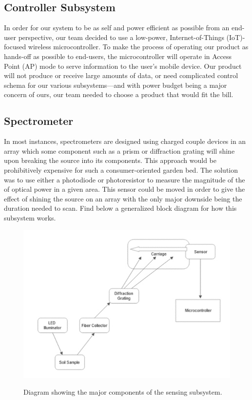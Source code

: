 \documentclass[journal]{IEEEtran}
\begin{document}
\subsection{Controller Subsystem}

In order for our system to be as self and power efficient as possible from an end-user perspective, our team decided to use a low-power, Internet-of-Things (IoT)-focused wireless microcontroller. To make the process of operating our product as hands-off as possible to end-users, the microcontroller will operate in Access Point (AP) mode to serve information to the user's mobile device. Our product will not produce or receive large amounts of data, or need complicated control schema for our various subsystems---and with power budget being a major concern of ours, our team needed to choose a product that would fit the bill.
\subsection{Spectrometer}
In most instances, spectrometers are designed using charged couple devices in an array which some
component such as a prism or diffraction grating will shine upon breaking the source into its
components. This approach would be prohibitively expensive for such a consumer-oriented garden
bed. The solution was to use either a photodiode or photoresistor to measure the magnitude of the
of optical power in a given area\cite{Cao}. This sensor could be moved in order to give the effect of shining
the source on an array with the only major downside being the duration needed to scan. Find below a
generalized block diagram for how this subsystem works.
\begin{figure}[H]
	\centering
	\includegraphics[width=\linewidth]{images/OpticsBlockDiagram.png}
	\label{fig:sensing-block}
	\caption{Diagram showing the major components of the sensing subsystem.}
\end{figure}
\end{document}
